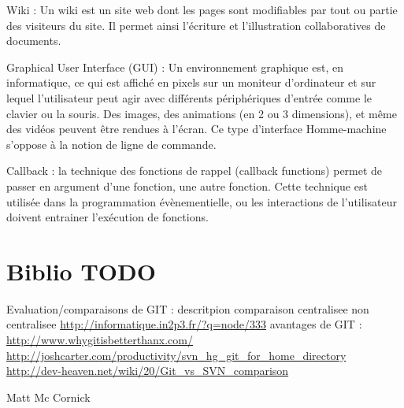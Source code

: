 Wiki : Un wiki est un site web dont les pages sont modifiables par tout ou partie des visiteurs du site. Il permet ainsi l'écriture et l'illustration collaboratives de documents.

Graphical User Interface (GUI) : Un environnement graphique est, en informatique, ce qui est affiché en pixels sur un moniteur
d'ordinateur et sur lequel l'utilisateur peut agir avec différents périphériques d'entrée comme le clavier ou la souris. 
Des images, des animations (en 2 ou 3 dimensions), et même des vidéos peuvent être rendues à l'écran.
Ce type d'interface Homme-machine s'oppose à la notion de ligne de commande.

Callback : la technique des fonctions de rappel (callback functions) permet de passer en argument d'une fonction, une autre fonction. 
Cette technique est utilisée dans la programmation évènementielle, ou les interactions de l'utilisateur doivent entrainer l'exécution de fonctions.

\chapter{Biblio TODO}

Evaluation/comparaisons de GIT :
descritpion comparaison centralisee non centralisee
\url{http://informatique.in2p3.fr/?q=node/333}
avantages de GIT :
\url{http://www.whygitisbetterthanx.com/}
\url{http://joshcarter.com/productivity/svn_hg_git_for_home_directory}
\url{http://dev-heaven.net/wiki/20/Git_vs_SVN_comparison}

Matt Mc Cornick

